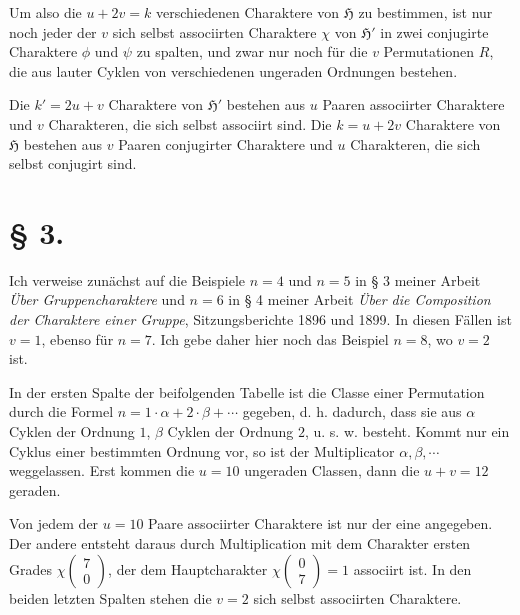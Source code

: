 \documentclass[11pt]{article}
\newcommand{\Hgr}{\mathfrak{H}}
\newcommand{\ch}[2]{\left(\begin{smallmatrix}#1\\#2\end{smallmatrix}\right)}
\begin{document}
Um also die $u+2v=k$ verschiedenen Charaktere von $\Hgr$ zu bestimmen, ist nur noch jeder der $v$ sich selbst associirten Charaktere $\chi$ von $\Hgr'$ in zwei conjugirte Charaktere $\phi$ und $\psi$ zu spalten, und zwar nur noch für die $v$ Permutationen $R$, die aus lauter Cyklen von verschiedenen ungeraden Ordnungen bestehen.

Die $k'=2u+v$ Charaktere von $\Hgr'$ bestehen aus $u$ Paaren associirter Charaktere und $v$ Charakteren, die sich selbst associirt sind. Die $k=u+2v$ Charaktere von $\Hgr$ bestehen aus $v$ Paaren conjugirter Charaktere und $u$ Charakteren, die sich selbst conjugirt sind.

\section*{§ 3.}

Ich verweise zunächst auf die Beispiele $n=4$ und $n=5$ in § 3 meiner Arbeit \emph{Über Gruppencharaktere} und $n=6$ in § 4 meiner Arbeit \emph{Über die Composition der Charaktere einer Gruppe}, Sitzungsberichte 1896 und 1899. In diesen Fällen ist $v=1$, ebenso für $n=7$. Ich gebe daher hier noch das Beispiel $n=8$, wo $v=2$ ist.

In der ersten Spalte der beifolgenden Tabelle ist die Classe einer Permutation durch die Formel $n=1\cdot\alpha+2\cdot\beta+\cdots$ gegeben, d. h. dadurch, dass sie aus $\alpha$ Cyklen der Ordnung $1$, $\beta$ Cyklen der Ordnung $2$, u. s. w. besteht. Kommt nur ein Cyklus einer bestimmten Ordnung vor, so ist der Multiplicator $\alpha,\beta,\cdots$ weggelassen. Erst kommen die $u=10$ ungeraden Classen, dann die $u+v=12$ geraden.

Von jedem der $u=10$ Paare associirter Charaktere ist nur der eine angegeben. Der andere entsteht daraus durch Multiplication mit dem Charakter ersten Grades $\chi\ch{7}{0}$, der dem Hauptcharakter $\chi\ch{0}{7}=1$ associirt ist. In den beiden letzten Spalten stehen die $v=2$ sich selbst associirten Charaktere.
\end{document}

